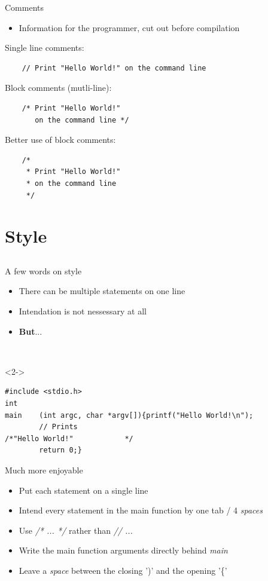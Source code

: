 \begin{frame}[fragile]{Comments}
	\begin{itemize}
		\item Information for the programmer, cut out before compilation
	\end{itemize}
	Single line comments:
	\begin{lstlisting}
	// Print "Hello World!" on the command line
\end{lstlisting}
	Block comments (mutli-line):
	\begin{lstlisting}
	/* Print "Hello World!"
	   on the command line */
\end{lstlisting}
	Better use of block comments:
	\begin{lstlisting}
	/*
	 * Print "Hello World!"
	 * on the command line
	 */
\end{lstlisting}
\end{frame}
\section{Style}
\subsection{}
\begin{frame}[fragile]{A few words on style}
	\begin{itemize}
		\item There can be multiple statements on one line
		\item Intendation is not nessessary at all
		\item<2-> \textbf{But}...
	\end{itemize}
	\ \\
	\begin{uncoverenv}<2->
	\begin{lstlisting}[numbers=none]
#include <stdio.h>
int
main	(int argc, char *argv[]){printf("Hello World!\n");
		// Prints
/*"Hello World!"			*/
		return 0;}
\end{lstlisting}
	\end{uncoverenv}
\end{frame}
\begin{frame}{Much more enjoyable}
	\begin{itemize}
		\item Put each statement on a single line
		\item Intend every statement in the main function by one tab / 4 \textit{spaces}
		\item Use \textit{/* ... */} rather than \textit{// ...}
		\item Write the main function arguments directly behind \textit{main}
		\item Leave a \textit{space} between the closing ')' and the opening '\{'
	\end{itemize}
\end{frame}



